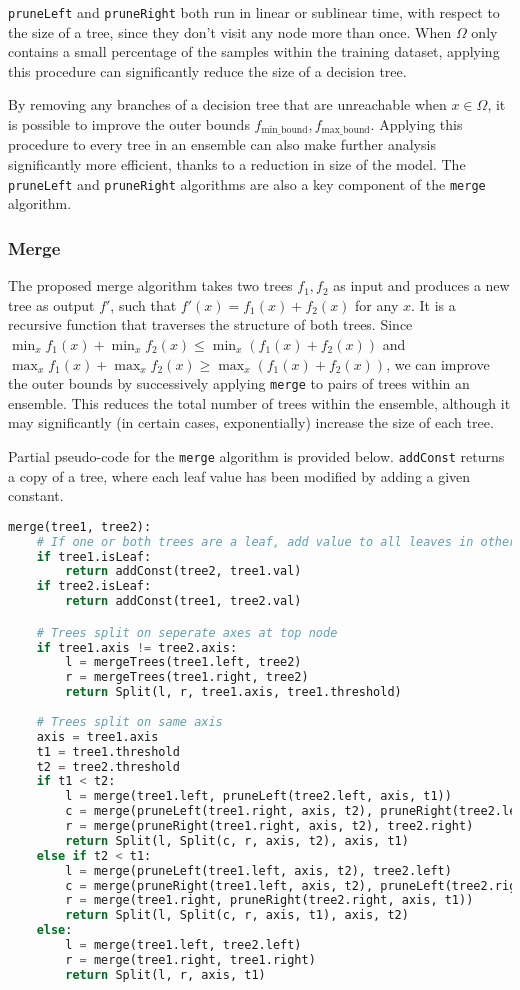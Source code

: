 \documentclass[pageno]{jpaper}
\newcommand{\fminb}{f_{\textrm{min\_bound}}}
\newcommand{\fmaxb}{f_{\textrm{max\_bound}}}
\begin{document}
\begin{doublespacing}
\verb|pruneLeft| and \verb|pruneRight| both run in linear or sublinear time, with respect to the size of a tree, since they don't visit any node more than once. When $\Omega$ only contains a small percentage of the samples within the training dataset, applying this procedure can significantly reduce the size of a decision tree. 

By removing any branches of a decision tree that are unreachable when $x \in \Omega$, it is possible to improve the outer bounds $\fminb, \fmaxb$. Applying this procedure to every tree in an ensemble can also make further analysis significantly more efficient, thanks to a reduction in size of the model. The \verb|pruneLeft| and \verb|pruneRight| algorithms are also a key component of the \verb|merge| algorithm.

\subsubsection{Merge}
The proposed merge algorithm takes two trees $f_1, f_2$ as input and produces a new tree as output $f'$, such that $f'(x) = f_1(x) + f_2(x)$ for any $x$. It is a recursive function that traverses the structure of both trees. Since $\min_x f_1 (x) + \min_x f_2 (x) \le \min_x (f_1 (x) + f_2 ( x))$ and $\max_x f_1 (x) + \max_x f_2 (x) \ge \max_x (f_1 (x) + f_2(x))$, we can improve the outer bounds by successively applying \verb|merge| to pairs of trees within an ensemble. This reduces the total number of trees within the ensemble, although it may significantly (in certain cases, exponentially) increase the size of each tree.

Partial pseudo-code for the \verb|merge| algorithm is provided below. \verb|addConst| returns a copy of a tree, where each leaf value has been modified by adding a given constant.

{\singlespacing
\begin{lstlisting}[language=Python, caption=merge algorithm]
merge(tree1, tree2):
	# If one or both trees are a leaf, add value to all leaves in other tree
	if tree1.isLeaf:
		return addConst(tree2, tree1.val)
	if tree2.isLeaf:
		return addConst(tree1, tree2.val)

	# Trees split on seperate axes at top node
	if tree1.axis != tree2.axis:
		l = mergeTrees(tree1.left, tree2)
		r = mergeTrees(tree1.right, tree2)
		return Split(l, r, tree1.axis, tree1.threshold)
	
	# Trees split on same axis
	axis = tree1.axis
	t1 = tree1.threshold
	t2 = tree2.threshold
	if t1 < t2:
		l = merge(tree1.left, pruneLeft(tree2.left, axis, t1))
		c = merge(pruneLeft(tree1.right, axis, t2), pruneRight(tree2.left, axis, t1))
		r = merge(pruneRight(tree1.right, axis, t2), tree2.right)
		return Split(l, Split(c, r, axis, t2), axis, t1)
	else if t2 < t1:
		l = merge(pruneLeft(tree1.left, axis, t2), tree2.left)
		c = merge(pruneRight(tree1.left, axis, t2), pruneLeft(tree2.right, axis, t1))
		r = merge(tree1.right, pruneRight(tree2.right, axis, t1))
		return Split(l, Split(c, r, axis, t1), axis, t2)
	else:
		l = merge(tree1.left, tree2.left)
		r = merge(tree1.right, tree1.right)
		return Split(l, r, axis, t1)
\end{lstlisting}
}


\end{doublespacing}
\end{document}

